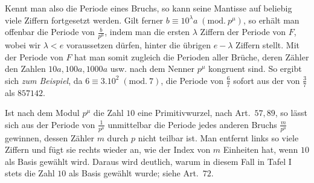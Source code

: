 Kennt man also die Periode eines Bruchs, so kann seine Mantisse auf beliebig viele Ziffern fortgesetzt werden. Gilt ferner \(b\equiv10^\lambda a\; (\mathrm{mod}.\ p^\mu)\), so erhält man offenbar die Periode von \(\frac b{p^\mu}\), indem man die ersten \(\lambda\) Ziffern der Periode von \(F\), wobei wir \(\lambda<e\) voraussetzen dürfen, hinter die übrigen \(e-\lambda\) Ziffern stellt. Mit der Periode von \(F\) hat man somit zugleich die Perioden aller Brüche, deren Zähler den Zahlen \(10a,100a,1000a\) usw. nach dem Nenner \(p^\mu\) kongruent sind. So ergibt sich \textit{zum Beispiel}, da \(6\equiv3.10^2\; (\mathrm{mod}.\ 7)\), die Periode von \(\frac67\) sofort aus der von \(\frac37\) als \(857142\).

Ist nach dem Modul \(p^\mu\) die Zahl \(10\) eine Primitivwurzel, nach Art.\ \(57,89\), so lässt sich aus der Periode von \(\frac1{p^\mu}\) unmittelbar die Periode jedes anderen Bruchs \(\frac m{p^\mu}\) gewinnen, dessen Zähler \(m\) durch \(p\) nicht teilbar ist. Man entfernt links so viele Ziffern und fügt sie rechts wieder an, wie der Index von \(m\) Einheiten hat, wenn \(10\) als Basis gewählt wird. Daraus wird deutlich, warum in diesem Fall in Tafel I stets die Zahl \(10\) als Basis gewählt wurde; siehe Art.\ \(72\).

